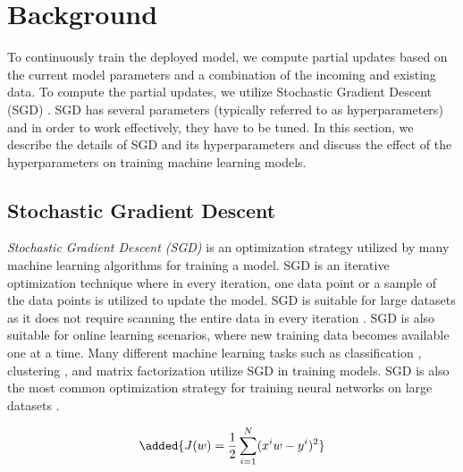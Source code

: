 \section{Background} \label{background}
To continuously train the deployed model, we compute partial updates based on the current model parameters and a combination of the incoming and existing data.
To compute the partial updates, we utilize Stochastic Gradient Descent (SGD) \cite{zhang2004solving}.
SGD has several parameters (typically referred to as hyperparameters) and in order to work effectively, they have to be tuned.
In this section, we describe the details of SGD and its hyperparameters and discuss the effect of the hyperparameters on training machine learning models.

\subsection{Stochastic Gradient Descent} \label{sgd}
\textit{Stochastic Gradient Descent (SGD)} is an optimization strategy utilized by many machine learning algorithms for training a model.
SGD is an iterative optimization technique where in every iteration, one data point or a sample of the data points is utilized to update the model.
SGD is suitable for large datasets as it does not require scanning the entire data in every iteration \cite{bottou2010large}.
SGD is also suitable for online learning scenarios, where new training data becomes available one at a time.
Many different machine learning tasks such as classification \cite{zhang2004solving, macmahan2013}, clustering \cite{bottou1995convergence}, and matrix factorization \cite{koren2009matrix} utilize SGD in training models.
SGD is also the most common optimization strategy for training neural networks on large datasets \cite{dean2012large}.

\begin{equation}
\added{J(w)=\dfrac{1}{2}\sum_{i=1}^{N}(x^iw - y^i)^2}
\end{equation}


